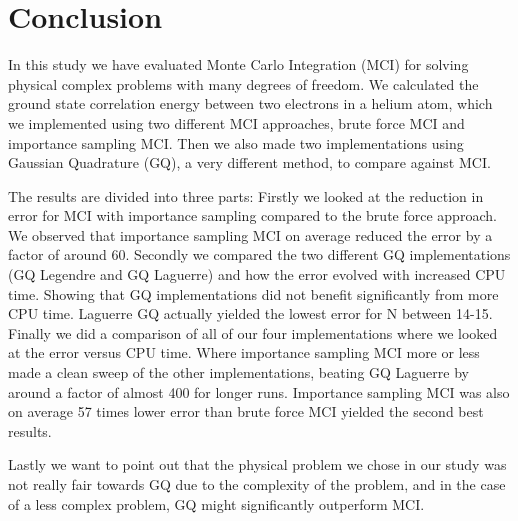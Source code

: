 \section{Conclusion}
In this study we have evaluated Monte Carlo Integration (MCI) for solving
physical complex problems with many degrees of freedom. We calculated the ground state correlation energy between two electrons in a helium
atom, which we implemented using two different MCI approaches, brute force MCI
and importance sampling MCI. Then we also made two implementations using
Gaussian Quadrature (GQ), a very different method, to compare against MCI. 

The results are divided into three parts: Firstly we looked at the reduction in
error for MCI with importance sampling compared to the brute force
approach. We observed that importance sampling MCI on average reduced the error
by a factor of around 60. Secondly we compared the
two different GQ implementations (GQ Legendre and GQ Laguerre) and how the error
evolved with increased CPU time. Showing that GQ implementations did not benefit
significantly from more CPU time. Laguerre GQ actually yielded the lowest error 
for N between 14-15. Finally we did a comparison of all of our four
implementations where we looked at the error versus CPU time. Where
importance sampling MCI more or less made a clean sweep of the other
implementations, beating GQ Laguerre by around a factor of almost 400 for longer
runs. Importance sampling MCI was also on average 57 times lower error than
brute force MCI yielded the second best results.      

Lastly we want to point out that the physical problem we chose in our study was
not really fair towards GQ due to the complexity of the problem, and in the case
of a less complex problem, GQ might significantly outperform MCI.
 
